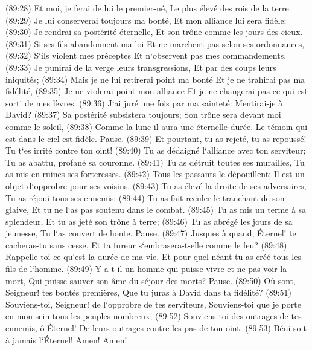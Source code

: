 \verse (89:28) Et moi, je ferai de lui le premier-né, Le plus élevé des rois de la terre. 
\verse (89:29) Je lui conserverai toujours ma bonté, Et mon alliance lui sera fidèle; 
\verse (89:30) Je rendrai sa postérité éternelle, Et son trône comme les jours des cieux. 
\verse (89:31) Si ses fils abandonnent ma loi Et ne marchent pas selon ses ordonnances, 
\verse (89:32) S`ils violent mes préceptes Et n`observent pas mes commandements, 
\verse (89:33) Je punirai de la verge leurs transgressions, Et par des coups leurs iniquités; 
\verse (89:34) Mais je ne lui retirerai point ma bonté Et je ne trahirai pas ma fidélité, 
\verse (89:35) Je ne violerai point mon alliance Et je ne changerai pas ce qui est sorti de mes lèvres. 
\verse (89:36) J`ai juré une fois par ma sainteté: Mentirai-je à David? 
\verse (89:37) Sa postérité subsistera toujours; Son trône sera devant moi comme le soleil, 
\verse (89:38) Comme la lune il aura une éternelle durée. Le témoin qui est dans le ciel est fidèle. Pause. 
\verse (89:39) Et pourtant, tu as rejeté, tu as repoussé! Tu t`es irrité contre ton oint! 
\verse (89:40) Tu as dédaigné l`alliance avec ton serviteur; Tu as abattu, profané sa couronne. 
\verse (89:41) Tu as détruit toutes ses murailles, Tu as mis en ruines ses forteresses. 
\verse (89:42) Tous les passants le dépouillent; Il est un objet d`opprobre pour ses voisins. 
\verse (89:43) Tu as élevé la droite de ses adversaires, Tu as réjoui tous ses ennemis; 
\verse (89:44) Tu as fait reculer le tranchant de son glaive, Et tu ne l`as pas soutenu dans le combat. 
\verse (89:45) Tu as mis un terme à sa splendeur, Et tu as jeté son trône à terre; 
\verse (89:46) Tu as abrégé les jours de sa jeunesse, Tu l`as couvert de honte. Pause. 
\verse (89:47) Jusques à quand, Éternel! te cacheras-tu sans cesse, Et ta fureur s`embrasera-t-elle comme le feu? 
\verse (89:48) Rappelle-toi ce qu`est la durée de ma vie, Et pour quel néant tu as créé tous les fils de l`homme. 
\verse (89:49) Y a-t-il un homme qui puisse vivre et ne pas voir la mort, Qui puisse sauver son âme du séjour des morts? Pause. 
\verse (89:50) Où sont, Seigneur! tes bontés premières, Que tu juras à David dans ta fidélité? 
\verse (89:51) Souviens-toi, Seigneur! de l`opprobre de tes serviteurs, Souviens-toi que je porte en mon sein tous les peuples nombreux; 
\verse (89:52) Souviens-toi des outrages de tes ennemis, ô Éternel! De leurs outrages contre les pas de ton oint. 
\verse (89:53) Béni soit à jamais l`Éternel! Amen! Amen! 

\chapter{}

